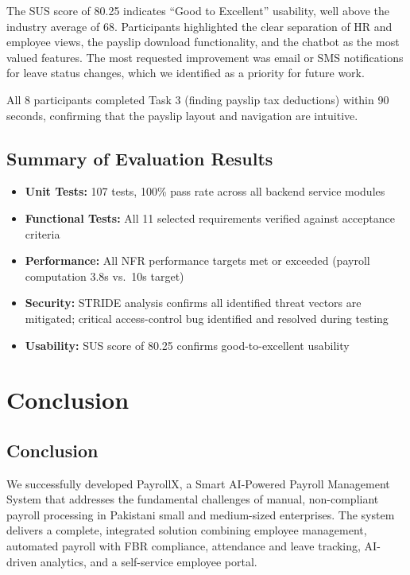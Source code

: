 \documentclass[12pt,a4paper]{report}
\begin{document}
The SUS score of 80.25 indicates ``Good to Excellent'' usability, well above the industry average of 68. Participants highlighted the clear separation of HR and employee views, the payslip download functionality, and the chatbot as the most valued features. The most requested improvement was email or SMS notifications for leave status changes, which we identified as a priority for future work.

All 8 participants completed Task 3 (finding payslip tax deductions) within 90 seconds, confirming that the payslip layout and navigation are intuitive.

\section{Summary of Evaluation Results}

\begin{itemize}
    \item \textbf{Unit Tests:} 107 tests, 100\% pass rate across all backend service modules
    \item \textbf{Functional Tests:} All 11 selected requirements verified against acceptance criteria
    \item \textbf{Performance:} All NFR performance targets met or exceeded (payroll computation 3.8s vs.\ 10s target)
    \item \textbf{Security:} STRIDE analysis confirms all identified threat vectors are mitigated; critical access-control bug identified and resolved during testing
    \item \textbf{Usability:} SUS score of 80.25 confirms good-to-excellent usability
\end{itemize}

\chapter{Conclusion}
\label{chap:conclusion}

\section{Conclusion}

We successfully developed PayrollX, a Smart AI-Powered Payroll Management System that addresses the fundamental challenges of manual, non-compliant payroll processing in Pakistani small and medium-sized enterprises. The system delivers a complete, integrated solution combining employee management, automated payroll with FBR compliance, attendance and leave tracking, AI-driven analytics, and a self-service employee portal.
\end{document}
